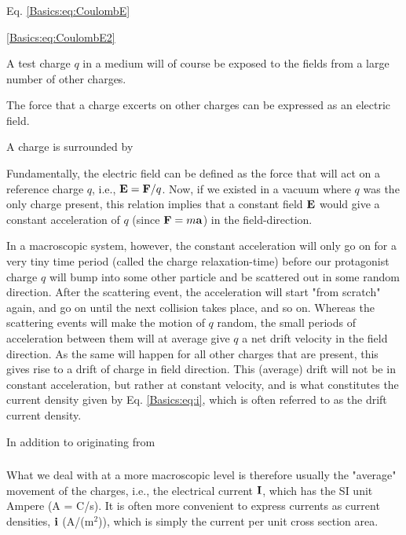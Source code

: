 {\subsubsection{}

Eq. \ref{Basics:eq:CoulombE}

\ref{Basics:eq:CoulombE2}

A test charge $q$ in a medium will of course be exposed to the fields from a large number of other charges. 





The force that a charge excerts on other charges can be expressed as an electric field.

A charge is surrounded by 

Fundamentally, the electric field can be defined as the force that will act on a reference charge $q$, i.e., ${\bf E} = {\bf F}/q$. Now, if we existed in a vacuum where $q$ was the only charge present, this relation implies that a constant field ${\bf E}$ would give a constant acceleration of $q$ (since ${\bf F} = m{\bf a}$) in the field-direction. 

In a macroscopic system, however, the constant acceleration will only go on for a very tiny time period (called the charge relaxation-time) before our protagonist charge $q$ will bump into some other particle and be scattered out in some random direction. After the scattering event, the acceleration will start "from scratch" again, and go on until the next collision takes place, and so on. Whereas the scattering events will make the motion of $q$ random, the small periods of acceleration between them will at average give $q$ a net drift velocity in the field direction. As the same will happen for all other charges that are present, this gives rise to a drift of charge in field direction. This (average) drift will not be in constant acceleration, but rather at constant velocity, and is what constitutes the current density given by Eq. \ref{Basics:eq:i}, which is often referred to as the drift current density. 


In addition to originating from 




\subsubsection{}

What we deal with at a more macroscopic level is therefore usually the "average" movement of the charges, i.e., the electrical current ${\bf I}$, which has the SI unit Ampere (A = C/s). It is often more convenient to express currents as current densities, ${\bf i}$ (A/(m$^2$)), which is simply the current per unit cross section area. 

}
